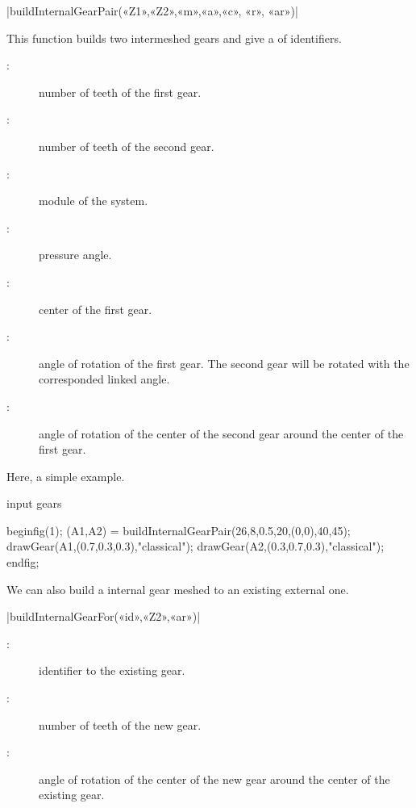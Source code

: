 \documentclass[english]{ltxdoc}
\begin{document}
\begin{colourband}
\commande|buildInternalGearPair(«Z1»,«Z2»,«m»,«a»,«c», «r», «ar»)|\smallskip{}

This function builds two  intermeshed gears and give a  of 
identifiers. 
\begin{description}
  \item[:]  number of teeth of the first gear.
  \item[:]  number of teeth of the second gear.
  \item[:]  module of the system.
  \item[:]  pressure angle.
  \item[:]  center of the first gear.
  \item[:]  angle of rotation of the first gear.
  The second gear will be rotated with the corresponded linked angle. 
  \item[:]  angle of rotation of the center
  of the second gear around the center of the first gear.
\end{description}
\end{colourband}

Here, a simple example.
\begin{ExempleMP}
input gears

beginfig(1);
(A1,A2) = buildInternalGearPair(26,8,0.5,20,(0,0),40,45);
drawGear(A1,(0.7,0.3,0.3),"classical");
drawGear(A2,(0.3,0.7,0.3),"classical");
endfig;
\end{ExempleMP}

We can also build a internal gear meshed to an existing external one.


\begin{colourband}
\commande|buildInternalGearFor(«id»,«Z2»,«ar»)|\smallskip{}
\begin{description}
  \item[:]  identifier to the existing gear.
  \item[:]  number of teeth of the new gear.
  \item[:]  angle of rotation of the center
  of the new gear around the center of the existing gear.
\end{description}
\end{colourband}
\end{document}
